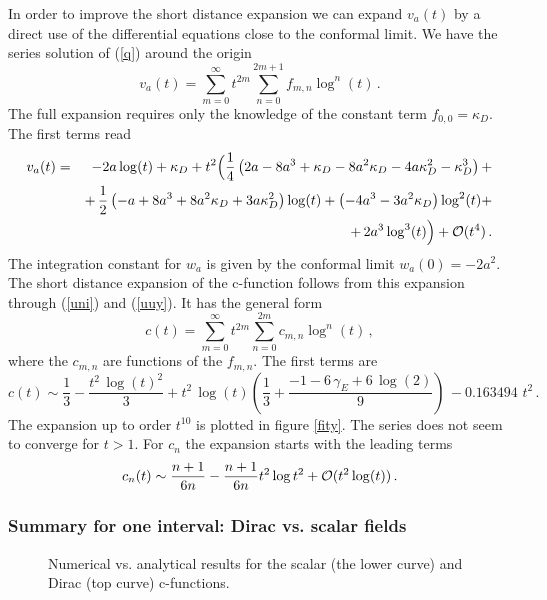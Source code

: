 \documentclass[11pt]{article}
\def\nn{\nonumber}
\begin{document}
In order to improve the short distance expansion we can expand $v_{a }(t)$ by
a direct use of the differential equations close to the conformal limit. We have the series
solution of (\ref{q}) around the origin
\begin{equation}
v_{a }(t)=\sum_{m=0}^{\infty }t^{2m}\sum_{n=0}^{2m+1}f_{m,n}\log
^{n}(t)\,.
\end{equation}
The full expansion requires only the knowledge of the constant term $
f_{0,0}=\kappa_D$. The first terms read
\begin{eqnarray}
v_{a }(t) &=&-2 a \log (t)+\kappa_D+t^{2}\Bigl( \frac{1}{4}\left( 2 a
-8 a ^{3}+\kappa_D-8 a ^{2}\kappa_D-4 a \kappa_D^{2}-\kappa_D^{3}\right) +\nn\\   
&&+\,\frac{1}{2}\left( - a +8 a ^{3}+8 a ^{2}\kappa_D+3 a
\kappa_D^{2}\right) \log (t) + \left( -4 a ^{3}-3 a ^{2}\kappa_D\right) \log^{2}(t)+ \nn\\
&& + \, 2 a ^{3}\log ^{3}(t)\Bigr) +\mathcal{O}(t^{4}) \,.\nn 
\end{eqnarray}
 The integration constant for $
w_{a }$ is given by the conformal limit $w_{a
}(0)=-2 a ^{2}$. The short distance expansion of the c-function follows from this expansion through (\ref{uni}) and (\ref{uuy}). It has the general form 
\begin{equation}
c(t)=  \sum_{m=0}^{\infty }t^{2m}\sum_{n=0}^{2m}c_{m,n}\log
^{n}(t)\,,
\end{equation}
where the $c_{m,n}$ are functions of the $f_{m,n}$.
The first terms are
\begin{equation}
c(t)\sim\frac{1}{3}- \frac{t^2\,{\log (t)}^2}{3}+ t^2\,\log (t)\left( \frac{1}{3} +\frac{-1 - 6\,\gamma_E + 6\,\log (2)}{9} \right) \, - 0.163494\, \,t^2 \,.\label{expi}
\end{equation}
  The expansion up to order $t^{10}$ is plotted in figure \ref{fity}. The series does not seem to converge for $t>1$. For $c_n$ the expansion starts with the leading terms
  \begin{equation}
 c_n(t)\sim \frac{n+1}{6n}-\frac{n+1}{6n}t^2 \log t^2+{\cal O}(t^2 \log(t))\,.
\end{equation}



\subsubsection{Summary for one interval: Dirac vs. scalar fields}

\begin{figure} [tb]
\centering
\leavevmode
\epsfysize=5cm
\bigskip
{}
\caption{Numerical vs. analytical results for the scalar (the lower curve) and Dirac (top curve) c-functions.}
\label{pietro}
\end{figure}
\end{document}

